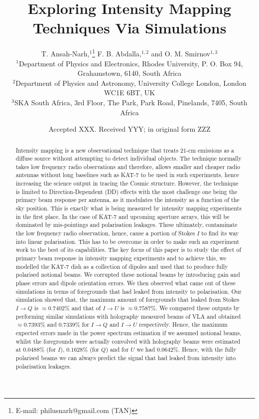 \documentclass[fleqn,usenatbib]{mnras}
\title[Intensity Mapping]{Exploring Intensity Mapping Techniques Via Simulations}
\author[T. Ansah-Narh et al.]{
T. Ansah-Narh,$^{1}$\thanks{E-mail: philusnarh@gmail.com (TAN)}
F. B. Abdalla,$^{1,2}$
and O. M. Smirnov$^{1,3}$
\\
$^{1}$Department of Physics and Electronics, Rhodes University, P. O. Box 94, Grahamstown, 6140, South Africa\\
$^{2}$Department of Physics and Astronomy, University College London, London WC1E 6BT, UK\\
$^{3}$SKA South Africa, 3rd Floor, The Park, Park Road, Pinelands, 7405, South Africa
}
\date{Accepted XXX. Received YYY; in original form ZZZ}
\newcommand{\filnote}[1]{\todo[inline, color=orange]{#1}}
\begin{document}
\label{firstpage}
\pagerange{\pageref{firstpage}--\pageref{lastpage}}
\maketitle

\begin{abstract}
%
Intensity mapping is a new observational technique that treats 21-cm emissions as a diffuse source without attempting to detect individual objects. The technique normally takes low frequency radio observations and therefore, allows smaller and cheaper radio antennas without long baselines such as KAT-7 to be used in such experiments, hence increasing the science output in tracing the  Cosmic structure. However, the technique is limited to Direction-Dependent (DD) effects with the most challenge one being the primary beam response per antenna, as it modulates the intensity as a function of the sky position. This is exactly what is being measured by intensity mapping experiments in the first place. In the case of KAT-7 and upcoming aperture arrays, this will be dominated by mis-pointings and polarisation leakages. These ultimately, contaminate the low frequency radio observation, hence, cause a portion of Stokes $I$ to find its way into linear polarisation. This has to be overcome in order to make such an experiment work to the best of its capabilities. The key focus of this paper is to study the effect of primary beam response in intensity mapping experiments and to achieve this, we modelled the KAT-7 dish as a collection of dipoles and used that to produce fully polarised notional beams. We corrupted these notional beams by introducing gain and phase errors and dipole orientation errors. We then observed what came out of these simulations in terms of foregrounds that had leaked from intensity to polarisation. Our simulation showed that, the maximum amount of foregrounds that leaked from Stokes $I \rightarrow Q$ is $\approx 0.7402 \%$ and that of  $I \rightarrow U$ is $\approx 0.7587 \%$. We compared these outputs by performing similar simulations with holography measured beams of VLA and obtained $\approx 0.7393 \%$ and $ 0.7339 \%$ for $I \rightarrow Q$ and $I \rightarrow U$ respectively. Hence, the maximum expected errors made in the power spectrum estimation if we assumed notional beams, whilst the foregrounds were actually convolved with  holography beams were estimated at $ 0.0488 \%$ (for $I$),  $0.1628 \%$  (for $Q$) and for $U$ we had $0.0642 \%$. Hence, with the fully polarised beams we can always predict the signal that had leaked from intensity into polarisation leakages.
\filnote{We need to look at the abstract in the end...}

\end{abstract}
\end{document}
